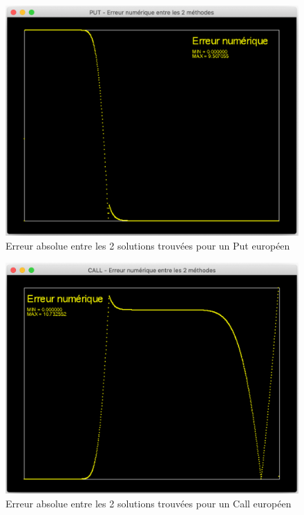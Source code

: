\documentclass[11pt,a4paper]{article}
\theoremstyle{plain}
\begin{document}
\begin{figure}[h]
    \centering
    \includegraphics[scale = 0.27]{img/put_error.png}
    \caption{Erreur absolue entre les 2 solutions trouvées pour un Put européen}
\end{figure}

\begin{figure}[h]
    \centering
    \includegraphics[scale = 0.27]{img/call_error.png}
    \caption{Erreur absolue entre les 2 solutions trouvées pour un Call européen}
\end{figure}
\end{document}
